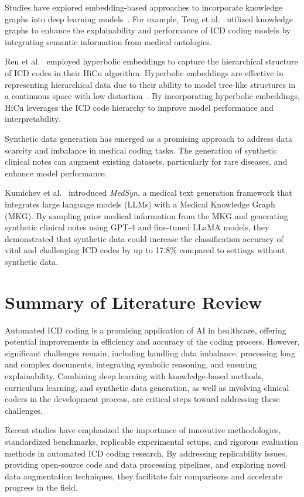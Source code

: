 \documentclass[12pt,a4paper]{report}
\begin{document}
Studies have explored embedding-based approaches to incorporate knowledge graphs into deep learning models~\cite{teng2020explainable, xie2019ehr}. For example, Teng et al.~\cite{teng2020explainable} utilized knowledge graphs to enhance the explainability and performance of ICD coding models by integrating semantic information from medical ontologies.

Ren et al.~\cite{ren2022hicu} employed hyperbolic embeddings to capture the hierarchical structure of ICD codes in their HiCu algorithm. Hyperbolic embeddings are effective in representing hierarchical data due to their ability to model tree-like structures in a continuous space with low distortion~\cite{nickel2017poincare}. By incorporating hyperbolic embeddings, HiCu leverages the ICD code hierarchy to improve model performance and interpretability.

Synthetic data generation has emerged as a promising approach to address data scarcity and imbalance in medical coding tasks. The generation of synthetic clinical notes can augment existing datasets, particularly for rare diseases, and enhance model performance.

Kumichev et al.~\cite{kumichev2024medsyn} introduced \textit{MedSyn}, a medical text generation framework that integrates large language models (LLMs) with a Medical Knowledge Graph (MKG). By sampling prior medical information from the MKG and generating synthetic clinical notes using GPT-4 and fine-tuned LLaMA models, they demonstrated that synthetic data could increase the classification accuracy of vital and challenging ICD codes by up to 17.8\% compared to settings without synthetic data.

\section{Summary of Literature Review}

Automated ICD coding is a promising application of AI in healthcare, offering potential improvements in efficiency and accuracy of the coding process. However, significant challenges remain, including handling data imbalance, processing long and complex documents, integrating symbolic reasoning, and ensuring explainability. Combining deep learning with knowledge-based methods, curriculum learning, and synthetic data generation, as well as involving clinical coders in the development process, are critical steps toward addressing these challenges.

Recent studies have emphasized the importance of innovative methodologies, standardized benchmarks, replicable experimental setups, and rigorous evaluation methods in automated ICD coding research. By addressing replicability issues, providing open-source code and data processing pipelines, and exploring novel data augmentation techniques, they facilitate fair comparisons and accelerate progress in the field.
\end{document}
